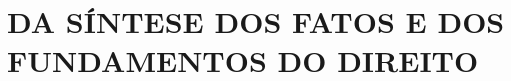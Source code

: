  


\newcommand{\Peticao}{PETIÇÃO DE DOCUMENTOS E INFORMAÇÕES}
\newcommand{\NumeroDoc}{004}



 




\section{DA SÍNTESE DOS FATOS E DOS FUNDAMENTOS DO DIREITO}

